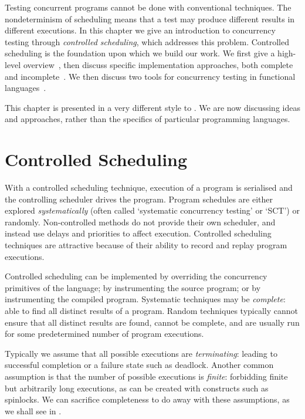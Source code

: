 Testing concurrent programs cannot be done with conventional
techniques.  The nondeterminism of scheduling means that a test may
produce different results in different executions.  In this chapter we
give an introduction to concurrency testing through \emph{controlled
  scheduling}, which addresses this problem.  Controlled scheduling is
the foundation upon which we build our work.  We first give a
high-level overview~, then discuss specific
implementation approaches, both complete~ and
incomplete~.  We then discuss two tools for
concurrency testing in functional languages~.

This chapter is presented in a very different style to
.  We are now discussing ideas and
approaches, rather than the specifics of particular programming
languages.

\section{Controlled Scheduling}
\label{sec:sct-fundamentals}

With a controlled scheduling technique, execution of a program is
serialised and the controlling scheduler drives the program.  Program
schedules are either explored
\emph{systematically}\cite{coons2013,flanagan2005,musuvathi2008,musuvathi2007}
(often called `systematic concurrency testing' or `SCT') or
randomly\cite{burckhardt2010,thomson2016}.  Non-controlled methods do
not provide their own scheduler, and instead use delays and priorities
to affect execution\cite{yu2012}.  Controlled scheduling techniques
are attractive because of their ability to record and replay program
executions.

Controlled scheduling can be implemented by overriding the concurrency
primitives of the language\cite{walker2015}; by instrumenting the
source program\cite{claessen2009}; or by instrumenting the compiled
program\cite{musuvathi2006,yu2012}.  Systematic techniques may be
\emph{complete}: able to find all distinct results of a program.
Random techniques typically cannot ensure that all distinct results
are found, cannot be complete, and are usually run for some
predetermined number of program executions.

Typically we assume that all possible executions are
\emph{terminating}: leading to successful completion or a failure
state such as deadlock.  Another common assumption is that the number
of possible executions is \emph{finite}: forbidding finite but
arbitrarily long executions, as can be created with constructs such as
spinlocks\cite{siberschatz1993}.  We can sacrifice completeness to do
away with these assumptions, as we shall see in
.

